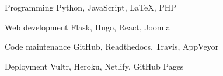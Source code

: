 \begin{minipage}[t]{0.5\textwidth}
\begin{cvskills}

  \cvskill
    {Programming} %
    {Python, JavaScript, LaTeX, PHP} %

  \cvskill
    {Web development} %
    {Flask, Hugo, React, Joomla} %

\cvskill
{Code maintenance} %
{GitHub, Readthedocs, Travis, AppVeyor} %

  \cvskill
    {Deployment} %
    {Vultr, Heroku, Netlify, GitHub Pages} %

\end{cvskills}
\end{minipage}
\begin{minipage}[t]{0.5\textwidth}


\begin{cvskills}



\end{cvskills}
\end{minipage}
